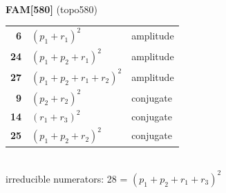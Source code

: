 \documentclass[10pt]{article}
\begin{document}
\begin{minipage}[t]{0.48\textwidth}
{}\\[2mm]\textbf{FAM[580]} (topo580)\\[2pt]{\footnotesize\begin{tabular}{@{}r@{\ \ }l@{\ \ }l@{}}\textbf{6} & $(p_1+r_1)^2$ & amplitude\\
\textbf{24} & $(p_1+p_2+r_1)^2$ & amplitude\\
\textbf{27} & $(p_1+p_2+r_1+r_2)^2$ & amplitude\\
\textbf{9} & $(p_2+r_2)^2$ & conjugate\\
\textbf{14} & $(r_1+r_3)^2$ & conjugate\\
\textbf{25} & $(p_1+p_2+r_2)^2$ & conjugate\\\end{tabular}}\\[2pt]{\scriptsize irreducible numerators: 28 = $(p_1+p_2+r_1+r_3)^2$}\end{minipage}\hfill%
\end{document}

